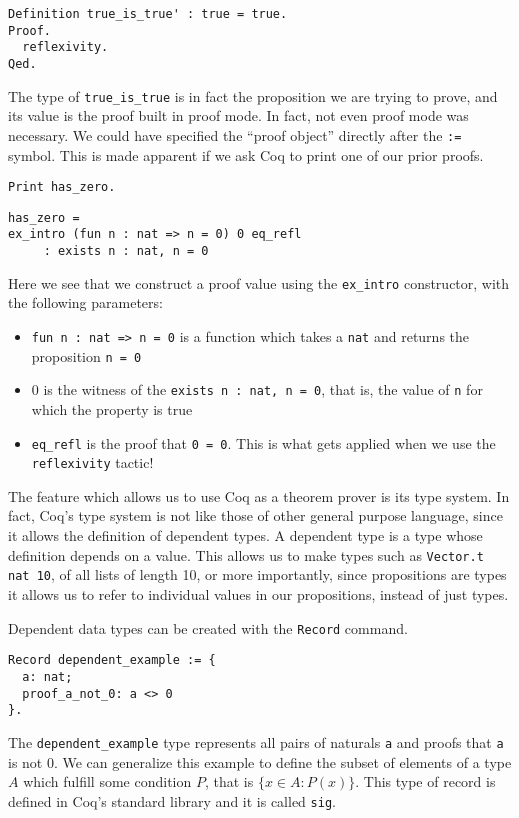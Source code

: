 \begin{verbatim}
Definition true_is_true' : true = true.
Proof.
  reflexivity.
Qed.
\end{verbatim}

The type of \texttt{true_is_true} is in fact the proposition we are trying to prove, and its 
value is the proof built in proof mode. In fact, not even proof mode was necessary. We could have 
specified the ``proof object'' directly after the \texttt{:=} symbol. This is made apparent if we
ask Coq to print one of our prior proofs.

\begin{verbatim}
Print has_zero. 
\end{verbatim}
\vspace{-\baselineskip}
\begin{verbatim}
has_zero = 
ex_intro (fun n : nat => n = 0) 0 eq_refl
     : exists n : nat, n = 0
\end{verbatim}


Here we see that we construct a proof value using the \texttt{ex_intro} constructor, with the
following parameters:
\begin{itemize}
    \item \texttt{fun n : nat => n = 0} is a function which takes a \texttt{nat} and returns the proposition \texttt{n = 0}
    \item 0 is the witness of the \texttt{exists n : nat, n = 0}, that is, the value of \texttt{n} for which the property is true
    \item \texttt{eq_refl} is the proof that \texttt{0 = 0}. This is what gets applied when we use the \texttt{reflexivity} tactic!
\end{itemize}

The feature which allows us to use Coq as a theorem prover is its type system. In fact, Coq's type system
is not like those of other general purpose language, since it allows the definition of dependent types. A
dependent type is a type whose definition depends on a value. This allows us to make types such as 
\texttt{Vector.t nat 10}, of all lists of length 10, or more importantly, since propositions are
types it allows us to refer to individual values in our propositions, instead of just types.

Dependent data types can be created with the \texttt{Record} command.
\begin{verbatim}
Record dependent_example := {
  a: nat;
  proof_a_not_0: a <> 0
}.
\end{verbatim}
The \texttt{dependent_example} type represents all pairs of naturals 
\texttt{a} and
proofs that \texttt{a} is not 0. We can generalize this example to define the subset of 
elements of a type $A$ which fulfill some condition $P$, that is $\{x \in A : P (x)\}$. This type of record is defined in Coq's standard
library and it is called \texttt{sig}.

